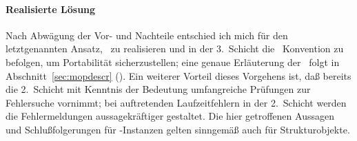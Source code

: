 \paragraph{Realisierte L\"{o}sung}%
\label{sec:plpsol}%
%
Nach Abw\"{a}gung der Vor- und Nachteile entschied ich mich f\"{u}r
den letztgenannten Ansatz, \dec[n]\ zu realisieren und in der
3.~Schicht die \og[e]\ Konvention zu befolgen, um Portabilit\"{a}t
sicherzustellen; eine genaue Erl\"{a}uterung der \dec[n]\ folgt in
Abschnitt~\ref{sec:mopdescr} (\citepage{\pageref{sec:mopdescr}}). Ein
weiterer Vorteil dieses Vorgehens ist, da\ss{} bereits
die 2.~Schicht mit Kenntnis der Bedeutung umfangreiche
Pr\"{u}fungen zur Fehlersuche vornimmt; bei auftretenden
Laufzeitfehlern in der 2.~Schicht werden die Fehlermeldungen
aussagekr\"{a}ftiger gestaltet.  Die hier getroffenen Aussagen und
Schlu\ss{}folgerungen f\"{u}r \clos-Instanzen gelten sinngem\"{a}\ss{} auch f\"{u}r
Strukturobjekte.
%
